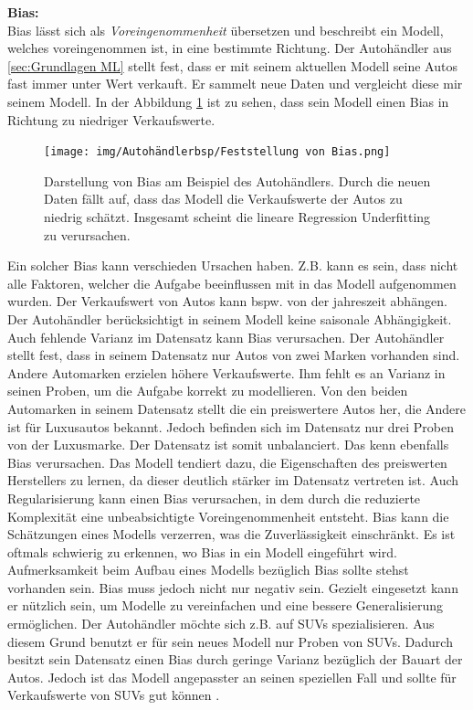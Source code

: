 \textbf{\gls{Bias}:}\\
\gls{Bias} lässt sich als \textit{Voreingenommenheit} übersetzen und beschreibt ein Modell, welches voreingenommen ist, in eine bestimmte Richtung. Der Autohändler aus \ref{sec:Grundlagen ML} stellt fest, dass er mit seinem aktuellen Modell seine Autos fast immer unter Wert verkauft. Er sammelt neue Daten und vergleicht diese mir seinem Modell. In der Abbildung \ref{fig:BspBias} ist zu sehen, dass sein Modell einen \gls{Bias} in Richtung zu niedriger Verkaufswerte.

\begin{figure}[htb]
    \centering
    \texttt{[image: img/Autohändlerbsp/Feststellung von Bias.png]}
    \caption[Darstellung von Bias am Beispiel des Autohändlers.]{Darstellung von Bias am Beispiel des Autohändlers. Durch die neuen Daten fällt auf, dass das Modell die Verkaufswerte der Autos zu niedrig schätzt. Insgesamt scheint die lineare Regression  \gls{Underfitting} zu verursachen.}
    \label{fig:BspBias}
\end{figure}

Ein solcher \gls{Bias} kann verschieden Ursachen haben. Z.B. kann es sein, dass nicht alle Faktoren, welcher die Aufgabe beeinflussen mit in das Modell aufgenommen wurden. Der Verkaufswert von Autos kann bspw. von der jahreszeit abhängen. Der Autohändler berücksichtigt in seinem Modell keine saisonale Abhängigkeit. Auch fehlende Varianz im Datensatz kann \gls{Bias} verursachen. Der Autohändler stellt fest, dass in seinem Datensatz nur Autos von zwei Marken vorhanden sind. Andere Automarken erzielen höhere Verkaufswerte. Ihm fehlt es an Varianz in seinen Proben, um die Aufgabe korrekt zu modellieren. Von den beiden Automarken in seinem Datensatz stellt die ein preiswertere Autos her, die Andere ist für Luxusautos bekannt. Jedoch  befinden sich im Datensatz nur drei Proben von der Luxusmarke. Der Datensatz ist somit unbalanciert. Das kenn ebenfalls \gls{Bias} verursachen. Das Modell tendiert dazu, die Eigenschaften des preiswerten Herstellers zu lernen, da dieser deutlich stärker im Datensatz vertreten ist. Auch \gls{Regularisierung} kann einen \gls{Bias} verursachen, in dem durch die reduzierte Komplexität eine unbeabsichtigte Voreingenommenheit entsteht. \gls{Bias} kann die Schätzungen eines Modells verzerren, was die Zuverlässigkeit einschränkt. Es ist oftmals schwierig zu erkennen, wo \gls{Bias} in ein Modell eingeführt wird. Aufmerksamkeit beim Aufbau eines Modells bezüglich \gls{Bias} sollte stehst vorhanden sein. \gls{Bias} muss jedoch nicht nur negativ sein. Gezielt eingesetzt kann er nützlich sein, um Modelle zu vereinfachen und eine bessere \gls{Generalisierung} ermöglichen. Der Autohändler möchte sich z.B. auf SUVs spezialisieren. Aus diesem Grund benutzt er für sein neues Modell nur Proben von SUVs. Dadurch besitzt sein Datensatz einen \gls{Bias} durch geringe Varianz bezüglich der Bauart der Autos. Jedoch ist das Modell angepasster an seinen speziellen Fall und sollte für Verkaufswerte von SUVs gut  können \cite{Burkov.2019, Goodfellow.2016, Mehrabi.2019}. \dubpar

